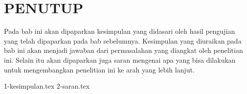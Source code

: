 \chapter{PENUTUP}
\label{chap:penutup}

Pada bab ini akan dipaparkan kesimpulan yang didasari oleh hasil pengujian yang telah dipaparkan pada bab sebelumnya.
Kesimpulan yang diuraikan pada bab ini akan menjadi jawaban dari permasalahan yang diangkat oleh penelitian ini.
Selain itu akan dipaparkan juga saran mengenai apa yang bisa dilakukan untuk mengembangkan penelitian ini ke arah yang lebih lanjut.

{1-kesimpulan.tex}
{2-saran.tex}
